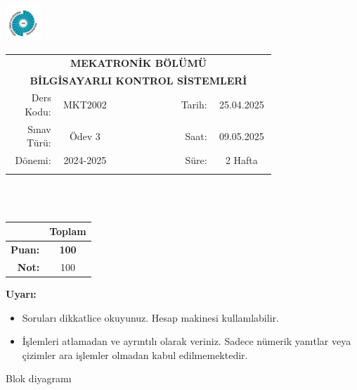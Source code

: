 \newcommand\UniversiteAdi{Niğde Ömer Halisdemir Üniversitesi}
\newcommand\BolumAdi{MEKATRONİK BÖLÜMÜ}
\newcommand\DersKodu{MKT2002}
\newcommand\DersAdi{BİLGİSAYARLI KONTROL SİSTEMLERİ}
\newcommand\SinavAdi{Ödev 3}
\newcommand\SinavTarihi{25.04.2025}
\newcommand\SinavSaati{09.05.2025}
\newcommand\SinavSuresi{2 Hafta}

\pagestyle{fancy}
\fancyhf{} %
\noindent \includegraphics[width=0.1\textwidth]{logo}
\begin{tabular}{
    p{0.15\linewidth}
    p{0.15\linewidth}
    p{0.2\linewidth}
    p{0.1\linewidth}
    p{0.15\linewidth}}
    \multicolumn{5}{c}{\textbf{\BolumAdi}}\\
    \multicolumn{5}{c}{\textbf{\DersAdi}}\\\hline
    \multicolumn{1}{|r|}{Ders Kodu:}&
    \multicolumn{1}{|c|}{\DersKodu}&
    \multicolumn{1}{|c|}{}& 
    \multicolumn{1}{|r|}{Tarih:}&
    \multicolumn{1}{|c|}{\SinavTarihi} \\\hline
    \multicolumn{1}{|r|}{Sınav Türü:}&
    \multicolumn{1}{|c|}{\SinavAdi}&  
    \multicolumn{1}{|c|}{}&
    \multicolumn{1}{|r|}{Saat:}&
    \multicolumn{1}{|c|}{\SinavSaati}\\\hline
    \multicolumn{1}{|r|}{Dönemi:}&
    \multicolumn{1}{|c|}{2024-2025}&
    \multicolumn{1}{|c|}{}&
    \multicolumn{1}{|r|}{Süre:}&
    \multicolumn{1}{|c|}{\SinavSuresi} \\\hline
    &&&&\\
\end{tabular}\\\\
\noindent\begin{center}
\begin{tabular}{|r|c|}\hline
    &\textbf{Toplam}\\\hline
    \textbf{Puan:} &\textbf{100}\\\hline
    \textbf{Not:}  &100\\\hline
\end{tabular}\end{center}
\noindent\textbf{Uyarı:}
\begin{itemize}\bfseries
    \item Soruları dikkatlice okuyunuz. Hesap makinesi kullanılabilir.
    \item İşlemleri atlamadan ve ayrıntılı olarak veriniz. Sadece nümerik yanıtlar veya çizimler ara işlemler olmadan kabul edilmemektedir.
\end{itemize} Blok diyagramı


